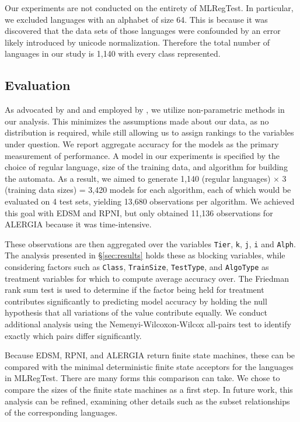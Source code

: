 \documentclass[twoside,11pt]{article}
\newcommand{\ttt}[1]{\texttt{#1}}
\newcommand{\tttx}[1]{\ttt{#1}\xspace}
\newcommand{\Alpha}{\tttx{Alph}}
\newcommand{\Tier}{\tttx{Tier}}
\newcommand{\Class}{\tttx{Class}}
\newcommand{\kay}{\tttx{k}}
\newcommand{\jay}{\tttx{j}}
\newcommand{\eye}{\tttx{i}}
\newcommand{\TrainSize}{\tttx{TrainSize}}
\newcommand{\TestType}{\tttx{TestType}}
\newcommand{\AlgoType}{\tttx{AlgoType}}
\newcommand{\note}[3]{{
    \normalfont
    \noindent
    \textcolor{#1}{\textbf{#2}: #3}
}}
\newcommand{\adil}[1]{\note{Orchid}{Adil}{#1}}
\begin{document}
Our experiments are not conducted on the entirety of MLRegTest. In particular, we excluded languages with an alphabet of size 64. This is because it was discovered that the data sets of those languages were confounded by an error likely introduced by unicode normalization. Therefore the total number of languages in our study is 1,140 with every class represented.

\subsection{Evaluation} \label{sec:evaluation}


As advocated by \citet{Demsar2006} and \citet{Stapor2017} and employed by \citet{heinz-etal-2022-mlregtest}, we utilize non-parametric methods in our analysis. 
This minimizes the assumptions made about our data, as no distribution is required, while still allowing us to assign rankings to the variables under question. We report aggregate accuracy for the models as the primary measurement of performance. 
A model in our experiments is specified by the choice of regular language, size of the training data, and algorithm for building the automata. 
As a result, we aimed to generate 1,140 (regular languages) $\times$ 3 (training data sizes) = 3,420 models for each algorithm, each of which would be evaluated on 4 test sets, yielding 13,680 observations per algorithm.
We achieved this goal with EDSM and RPNI, but only obtained 11,136 observations for ALERGIA because it was time-intensive.

These observations are then aggregated over the variables \Tier, \kay, \jay, \eye and \Alpha. The analysis presented in \S\ref{sec:results} holds these as blocking variables, while considering factors such as \Class, \TrainSize, \TestType, and \AlgoType as treatment variables for which to compute average accuracy over. The Friedman rank sum test is used to determine if the factor being held for treatment contributes significantly to predicting model accuracy by holding the null hypothesis that all variations of the value contribute equally. We conduct additional analysis using the Nemenyi-Wilcoxon-Wilcox all-pairs test to identify exactly which pairs differ significantly.

Because EDSM, RPNI, and ALERGIA return finite state machines, these can be compared with the minimal deterministic finite state acceptors for the languages in MLRegTest. 
There are many forms this comparison can take. We chose to compare the sizes of the finite state machines as a first step. 
In future work, this analysis can be refined, examining other details such as the subset relationships of the corresponding languages.
\end{document}
